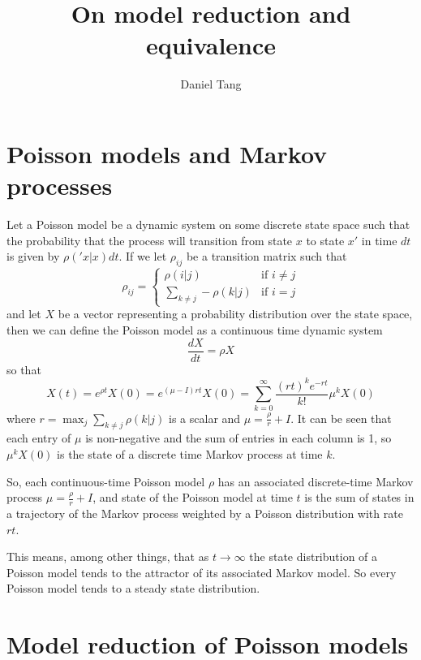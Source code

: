 \documentclass[a4paper]{article}
\title{On model reduction and equivalence}
\author{Daniel Tang}
\begin{document}
\maketitle
\section{Poisson models and Markov processes}

Let a Poisson model be a dynamic system on some discrete state space such that the probability that the process will transition from state $x$ to state $x'$ in time $dt$ is given by $\rho('x|x)dt$. If we let $\rho_{ij}$ be a transition matrix such that
\[
\rho_{ij} = 
\begin{cases}
\rho(i|j) & \text{if } i \ne j\\
\sum_{k \ne j} -\rho(k|j) & \text{if } i = j
\end{cases}
\]
and let $X$ be a vector representing a probability distribution over the state space, then we can define the Poisson model as a continuous time dynamic system
\[
\frac{dX}{dt} = \rho X
\]
so that
\[
X(t) = e^{\rho t}X(0) = e^{(\mu - I)rt}X(0) = \sum_{k=0}^\infty \frac{ (rt)^k e^{-rt}}{k!}\mu^kX(0)
\]
where $r = \max_j \sum_{k \ne j} \rho(k|j)$ is a scalar and $\mu = \frac{\rho}{r} + I$. It can be seen that each entry of $\mu$ is non-negative and the sum of entries in each column is 1, so $\mu^k X(0)$ is the state of a discrete time Markov process at time $k$.

So, each continuous-time Poisson model $\rho$ has an associated discrete-time Markov process $\mu = \frac{\rho}{r} + I$, and state of the Poisson model at time $t$ is the sum of states in a trajectory of the Markov process weighted by a Poisson distribution with rate $rt$.

This means, among other things, that as $t \to \infty$ the state distribution of a Poisson model tends to the attractor of its associated Markov model. So every Poisson model tends to a steady state distribution.

\section{Model reduction of Poisson models}
\end{document}
